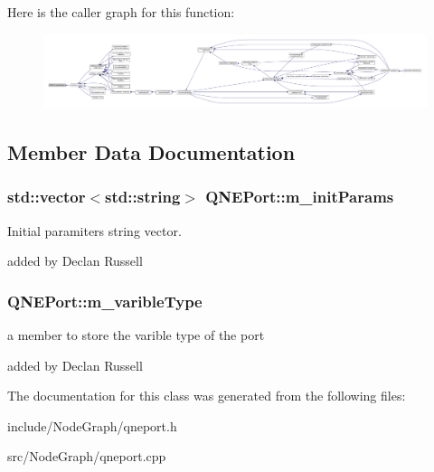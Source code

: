 Here is the caller graph for this function\-:
\nopagebreak
\begin{figure}[H]
\begin{center}
\leavevmode
\includegraphics[width=350pt]{class_q_n_e_port_aa8e18998a29ef7ec2d26143d6835d0cd_icgraph}
\end{center}
\end{figure}




\subsection{Member Data Documentation}
\hypertarget{class_q_n_e_port_ad6ace5a3c7aa1498da47efc4ff712f26}{
\subsubsection[{m\-\_\-init\-Params}]{\setlength{\rightskip}{0pt plus 5cm}std\-::vector$<$std\-::string$>$ Q\-N\-E\-Port\-::m\-\_\-init\-Params\hspace{0.3cm}{\ttfamily [private]}}}\label{class_q_n_e_port_ad6ace5a3c7aa1498da47efc4ff712f26}


Initial paramiters string vector. 

added by Declan Russell \hypertarget{class_q_n_e_port_a05cfe84736c4f2af8f177f0acf58116b}{
\subsubsection[{m\-\_\-varible\-Type}]{ Q\-N\-E\-Port\-::m\-\_\-varible\-Type\hspace{0.3cm}{\ttfamily [private]}}}\label{class_q_n_e_port_a05cfe84736c4f2af8f177f0acf58116b}


a member to store the varible type of the port 

added by Declan Russell 

The documentation for this class was generated from the following files\-:\begin{DoxyCompactItemize}
\item 
include/\-Node\-Graph/qneport.\-h\item 
src/\-Node\-Graph/qneport.\-cpp\end{DoxyCompactItemize}
